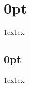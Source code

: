\documentclass{article}
\begin{document}
\titlespacing*\section{0pt}{1ex}{1ex}
\titlespacing*\subsection{0pt}{1ex}{1ex}
%
\setlength\abovecaptionskip{8pt}
\setlength\belowcaptionskip{-15pt}
\setlength\textfloatsep{0pt}
%
\setlength\abovedisplayskip{1pt}
\setlength\belowdisplayskip{1pt}
\end{document}
